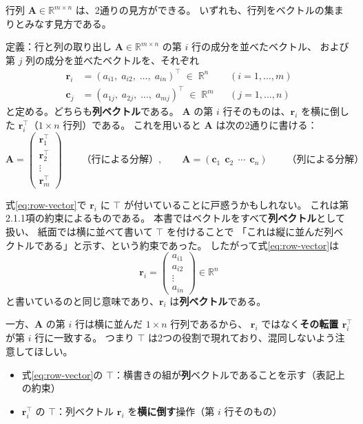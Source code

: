 行列 $\bm{A} \in \mathbb{R}^{m \times n}$ は、2通りの見方ができる。
いずれも、行列をベクトルの集まりとみなす見方である。

\begin{itembox}[l]{定義：行と列の取り出し}
$\bm{A} \in \mathbb{R}^{m \times n}$ の第 $i$ 行の成分を並べたベクトル、
および第 $j$ 列の成分を並べたベクトルを、それぞれ
\begin{align}
  \bm{r}_i &= (a_{i1},\; a_{i2},\; \ldots,\; a_{in})^\top \;\in\; \mathbb{R}^{n}
    &&(i = 1, \ldots, m) \label{eq:row-vector} \\
  \bm{c}_j &= (a_{1j},\; a_{2j},\; \ldots,\; a_{mj})^\top \;\in\; \mathbb{R}^{m}
    &&(j = 1, \ldots, n)
\end{align}
と定める。どちらも\textbf{列ベクトル}である。
$\bm{A}$ の第 $i$ 行そのものは、$\bm{r}_i$ を横に倒した $\bm{r}_i^\top$（$1 \times n$ 行列）である。
これを用いると $\bm{A}$ は次の2通りに書ける：
\begin{equation}
  \bm{A} =
  \begin{pmatrix} \bm{r}_1^\top \\ \bm{r}_2^\top \\ \vdots \\ \bm{r}_m^\top \end{pmatrix}
  \qquad \text{（行による分解）}, \qquad
  \bm{A} = (\bm{c}_1\ \ \bm{c}_2\ \ \cdots\ \ \bm{c}_n)
  \qquad \text{（列による分解）}
\end{equation}
\end{itembox}


式\eqref{eq:row-vector}で $\bm{r}_i$ に $\top$ が付いていることに戸惑うかもしれない。
これは第2.1.1項の約束によるものである。
本書ではベクトルをすべて\textbf{列ベクトル}として扱い、
紙面では横に並べて書いて $\top$ を付けることで
「これは縦に並んだ列ベクトルである」と示す、という約束であった。
したがって式\eqref{eq:row-vector}は
\begin{equation}
  \bm{r}_i = \begin{pmatrix} a_{i1} \\ a_{i2} \\ \vdots \\ a_{in} \end{pmatrix} \in \mathbb{R}^n
\end{equation}
と書いているのと同じ意味であり、$\bm{r}_i$ は\textbf{列ベクトル}である。

一方、$\bm{A}$ の第 $i$ 行は横に並んだ $1 \times n$ 行列であるから、
$\bm{r}_i$ ではなく\textbf{その転置 $\bm{r}_i^\top$} が第 $i$ 行に一致する。
つまり $\top$ は2つの役割で現れており、混同しないよう注意してほしい。
\begin{itemize}
  \item 式\eqref{eq:row-vector}の $\top$：横書きの組が\textbf{列}ベクトルであることを示す（表記上の約束）
  \item $\bm{r}_i^\top$ の $\top$：列ベクトル $\bm{r}_i$ を\textbf{横に倒す}操作（第 $i$ 行そのもの）
\end{itemize}

